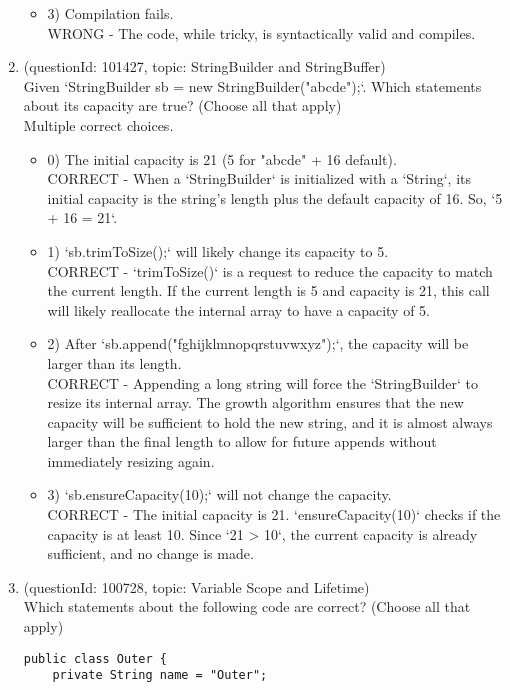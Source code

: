 \documentclass[12pt]{article}
\begin{document}
\begin{enumerate}[label=(\arabic*)]
\begin{itemize}
\item 3) Compilation fails.
 \\ 
WRONG - The code, while tricky, is syntactically valid and compiles.

\end{itemize}
\item (questionId: 101427, topic: StringBuilder and StringBuffer) \\ 
Given `StringBuilder sb = new StringBuilder("abcde");`. Which statements about its capacity are true? (Choose all that apply)
\\ \noindent Multiple correct choices. 
\begin{itemize}
\item 0) The initial capacity is 21 (5 for "abcde" + 16 default).
 \\ 
CORRECT - When a `StringBuilder` is initialized with a `String`, its initial capacity is the string's length plus the default capacity of 16. So, `5 + 16 = 21`.

\item 1) `sb.trimToSize();` will likely change its capacity to 5.
 \\ 
CORRECT - `trimToSize()` is a request to reduce the capacity to match the current length. If the current length is 5 and capacity is 21, this call will likely reallocate the internal array to have a capacity of 5.

\item 2) After `sb.append("fghijklmnopqrstuvwxyz");`, the capacity will be larger than its length.
 \\ 
CORRECT - Appending a long string will force the `StringBuilder` to resize its internal array. The growth algorithm ensures that the new capacity will be sufficient to hold the new string, and it is almost always larger than the final length to allow for future appends without immediately resizing again.

\item 3) `sb.ensureCapacity(10);` will not change the capacity.
 \\ 
CORRECT - The initial capacity is 21. `ensureCapacity(10)` checks if the capacity is at least 10. Since `21 > 10`, the current capacity is already sufficient, and no change is made.

\end{itemize}
\item (questionId: 100728, topic: Variable Scope and Lifetime) \\ 
Which statements about the following code are correct? (Choose all that apply)\n\begin{verbatim}
public class Outer {
    private String name = "Outer";


\end{verbatim}
\end{enumerate}
\end{document}
